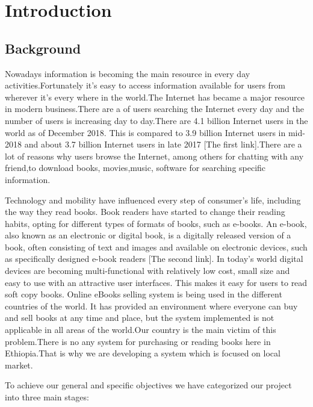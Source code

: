 \chapter{Introduction}
\section{Background}
Nowadays information is becoming the main resource in every day activities.Fortunately it's easy to access information available for users from wherever it's every where in the world.The Internet has became a major resource in modern business.There are a of users searching the Internet every day and the number of users is increasing day to day.There are 4.1 billion Internet users in the world as of December 2018. This is compared to 3.9 billion Internet users in mid-2018 and about 3.7 billion Internet users in late 2017 [The first link].There are a lot of reasons why users browse the Internet, among others for chatting with any friend,to download books, movies,music, software for searching specific information.


Technology and mobility have influenced every step of consumer’s life, including the way they read books. Book readers have started to change their reading habits, opting for different types of formats of books, such as e-books. An e-book, also known as an electronic or digital book, is a digitally released version of a book, often consisting of text and images and available on electronic devices, such as specifically designed e-book readers [The second link]. In today’s world digital devices are becoming multi-functional with relatively low cost, small size and easy to use with an attractive user interfaces. This makes it easy for users  to read  soft copy books.
Online eBooks selling system is being  used in the different countries of the  world. It has provided an environment where everyone can buy and sell books at any time and place, but the system implemented is not applicable in all areas of the world.Our country is the main victim of this problem.There is no any system for purchasing or reading books here in Ethiopia.That is why we are developing a system which is focused on local market.

To achieve our general and specific objectives we have categorized our project into three main stages:

